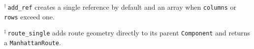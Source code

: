 \vspace{2.5pt}
\begin{minipage}[t]{0.49\textwidth}
\raggedright\footnotesize
$^{\dagger}$\,\texttt{add\_ref} creates a single reference by default and an
array when \texttt{columns} or \texttt{rows} exceed one.
\end{minipage}
\hfill
\begin{minipage}[t]{0.49\textwidth}
\raggedright\footnotesize
$^{\ddagger}$\,\texttt{route\_single} adds route geometry directly to its
parent \texttt{Component} and returns a \texttt{ManhattanRoute}.
\end{minipage}
\endgroup
